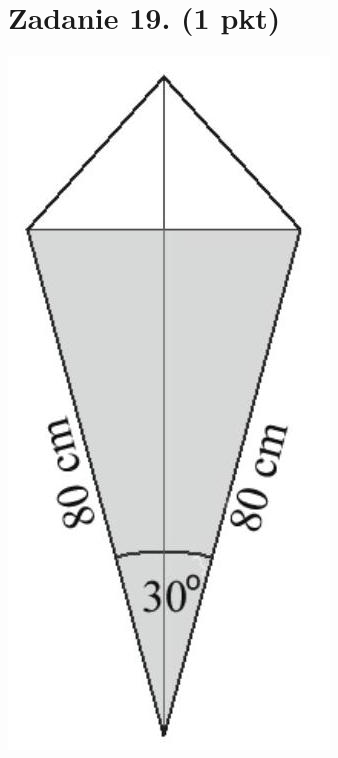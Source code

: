 \documentclass[10pt]{article}
\begin{document}
\section*{Zadanie 19. (1 pkt)}
\begin{center}
\includegraphics[max width=\textwidth]{2024_11_21_caf6b2e64dd65c9b24eeg-08}
\end{center}
\end{document}
